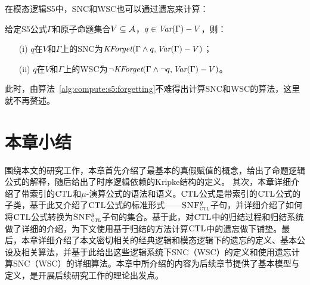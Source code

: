 在模态逻辑S5中，SNC和WSC也可以通过遗忘来计算：%
\begin{theorem}\label{thm:S5:SNC}
	给定S5公式$\Gamma$和原子命题集合$V\subseteq {\cal A}$，$q\in \textit{Var}(\Gamma) -V$，则：
	\begin{itemize}
		\item[(i)]  $q$在$V$和$\Gamma$上的SNC为$\textit{KForget}(\Gamma \wedge q, \textit{Var}(\Gamma)-V)$；
		\item[(ii)] $q$在$V$和$\Gamma$上的WSC为$\neg \textit{KForget}(\Gamma \wedge \neg q, \textit{Var}(\Gamma)-V)$。
	\end{itemize}
\end{theorem}
此时，由算法~\ref{alg:compute:s5:forgetting}不难得出计算SNC和WSC的算法，这里就不再赘述。


\section{本章小结}
围绕本文的研究工作，本章首先介绍了最基本的真假赋值的概念，给出了命题逻辑公式的解释，随后给出了时序逻辑依赖的Kripke结构的定义。
其次，本章详细介绍了带索引的$\textrm{CTL}$和$\mu$-演算公式的语法和语义。$\textrm{CTL}$公式是带索引的$\textrm{CTL}$公式的子类，基于此又介绍了$\textrm{CTL}$公式的标准形式——${\textsc{SNF}_{\textsc{ctl}}^g}$子句，并详细介绍了如何将$\textrm{CTL}$公式转换为${\textsc{SNF}_{\textsc{ctl}}^g}$子句的集合。基于此，对$\textrm{CTL}$中的归结过程和归结系统做了详细的介绍，为下文使用基于归结的方法计算$\textrm{CTL}$中的遗忘做下铺垫。最后，本章详细介绍了本文密切相关的经典逻辑和模态逻辑下的遗忘的定义、基本公设及相关算法，并基于此给出这些逻辑系统下SNC（WSC）的定义和使用遗忘计算SNC（WSC）的详细算法。本章中所介绍的内容为后续章节提供了基本模型与定义，是开展后续研究工作的理论出发点。

